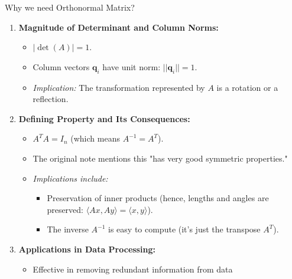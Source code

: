 \documentclass[aspectratio=169]{beamer}
\begin{document}
\begin{frame}{Why we need Orthonormal Matrix?}
    \begin{enumerate}
    \item \textbf{Magnitude of Determinant and Column Norms:}
    \begin{itemize}
        \item $|\det(A)| = 1$.
        \item Column vectors $\bm{q}_i$ have unit norm: $||\bm{q}_i|| = 1$.
        \item \textit{Implication:} The transformation represented by $A$ is a rotation or a reflection.
    \end{itemize}

    \item \textbf{Defining Property and Its Consequences:}
    \begin{itemize}
        \item $A^T A = I_n$ (which means $A^{-1} = A^T$).
        \item The original note mentions this "has very good symmetric properties."
        \item \textit{Implications include:}
        \begin{itemize}
            \item Preservation of inner products (hence, lengths and angles are preserved: $\langle Ax, Ay \rangle = \langle x, y \rangle$).
            \item The inverse $A^{-1}$ is easy to compute (it's just the transpose $A^T$).
        \end{itemize}
    \end{itemize}

    \item \textbf{Applications in Data Processing:}
    \begin{itemize}
        \item Effective in removing redundant information from data
    \end{itemize}
\end{enumerate}
\end{frame}
\end{document}
